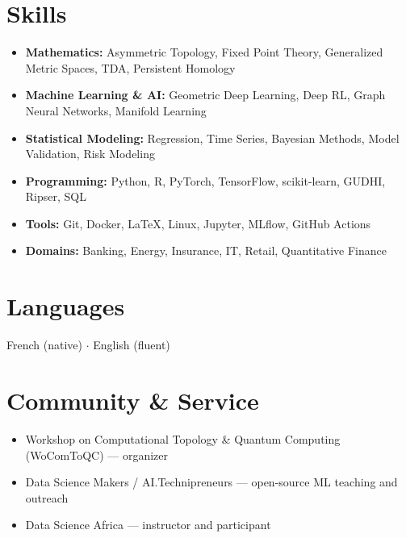 \documentclass[11pt,a4paper]{article}
\begin{document}
\section{Skills}

\begin{itemize}[leftmargin=1.5em,itemsep=2pt]
\item \textbf{Mathematics:} Asymmetric Topology, Fixed Point Theory, Generalized Metric Spaces, TDA, Persistent Homology
\item \textbf{Machine Learning \& AI:} Geometric Deep Learning, Deep RL, Graph Neural Networks, Manifold Learning
\item \textbf{Statistical Modeling:} Regression, Time Series, Bayesian Methods, Model Validation, Risk Modeling
\item \textbf{Programming:} Python, R, PyTorch, TensorFlow, scikit-learn, GUDHI, Ripser, SQL
\item \textbf{Tools:} Git, Docker, \LaTeX, Linux, Jupyter, MLflow, GitHub Actions
\item \textbf{Domains:} Banking, Energy, Insurance, IT, Retail, Quantitative Finance
\end{itemize}

\section{Languages}

French (native) $\cdot$ English (fluent)

\section{Community \& Service}

\begin{itemize}[leftmargin=1.5em,itemsep=2pt]
\item Workshop on Computational Topology \& Quantum Computing (WoComToQC) --- organizer
\item Data Science Makers / AI.Technipreneurs --- open-source ML teaching and outreach
\item Data Science Africa --- instructor and participant
\end{itemize}
\end{document}
